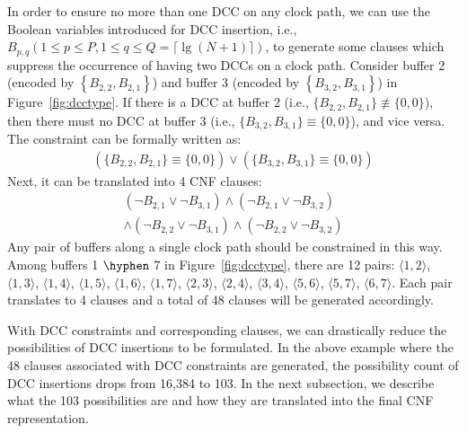 In order to ensure no more than one DCC on any clock path, we can use the Boolean variables introduced for DCC insertion, i.e., {\fontsize{9}{10}$B_{p,q} \left(1 \leq p \leq P, 1 \leq q \leq Q = \lceil \lg (N + 1) \rceil \right)$}, to generate some clauses which suppress the occurrence of having two DCCs on a clock path. Consider buffer 2 (encoded by {\fontsize{9}{10}$\left\{B_{2,2}, B_{2,1}\right\}$}) and buffer 3 (encoded by {\fontsize{9}{10}$\left\{B_{3,2}, B_{3,1}\right\}$}) in Figure~\ref{fig:dcctype}. If there is a DCC at buffer 2 (i.e., {\fontsize{9}{10}$\{B_{2,2}, B_{2,1}\} \not\equiv \{0, 0\}$}), then there must no DCC at buffer 3 (i.e., {\fontsize{9}{10}$\{B_{3,2}, B_{3,1}\} \equiv \{0, 0\}$}), and vice versa. The constraint can be formally written as:
{\fontsize{9}{10}
\begin{gather*}
\left(\{B_{2,2}, B_{2,1}\} \equiv \{0, 0\}\right) \lor \left(\{B_{3,2}, B_{3,1}\} \equiv \{0, 0\}\right)
\end{gather*}}
Next, it can be translated into 4 CNF clauses:
{\fontsize{9}{10}
\begin{equation*}
\begin{split}
(\neg B_{2,1}\lor\neg B_{3,1}) \land (\neg B_{2,1}\lor\neg B_{3,2}) \\
\land (\neg B_{2,2}\lor\neg B_{3,1}) \land (\neg B_{2,2}\lor\neg B_{3,2})
\end{split}
\end{equation*}}
Any pair of buffers along a single clock path should be constrained in this way. Among buffers 1 $\hyphen$ 7 in Figure~\ref{fig:dcctype}, there are 12 pairs: $\langle1, 2\rangle$, $\langle1, 3\rangle$, $\langle1, 4\rangle$, $\langle1, 5\rangle$, $\langle1, 6\rangle$, $\langle1, 7\rangle$, $\langle2, 3\rangle$, $\langle2, 4\rangle$, $\langle3, 4\rangle$, $\langle5, 6\rangle$, $\langle5, 7\rangle$, $\langle6, 7\rangle$. Each pair translates to 4 clauses and a total of 48 clauses will be generated accordingly.

With DCC constraints and corresponding clauses, we can drastically reduce the possibilities of DCC insertions to be formulated. In the above example where the 48 clauses associated with DCC constraints are generated, the possibility count of DCC insertions drops from 16,384 to 103. In the next subsection, we describe what the 103 possibilities are and how they are translated into the final CNF representation.


